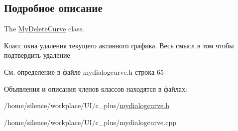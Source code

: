 \subsection{Подробное описание}
The \hyperlink{class_my_delete_curve}{My\+Delete\+Curve} class. 

Класс окна удаления текущего активного графика. Весь смысл в том чтобы подтвердить удаление 

См. определение в файле mydialogcurve.\+h строка 65



Объявления и описания членов классов находятся в файлах\+:\begin{DoxyCompactItemize}
\item 
/home/silence/workplace/\+U\+I/c\+\_\+plus/\hyperlink{mydialogcurve_8h}{mydialogcurve.\+h}\item 
/home/silence/workplace/\+U\+I/c\+\_\+plus/mydialogcurve.\+cpp\end{DoxyCompactItemize}
